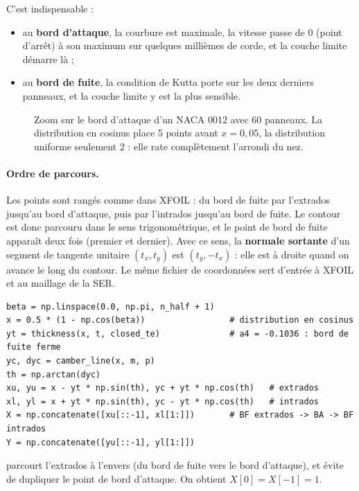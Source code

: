 C'est indispensable :
\begin{itemize}
\item au \textbf{bord d'attaque}, la courbure est maximale, la vitesse passe de 0 (point d'arrêt) à son maximum sur quelques millièmes de corde, et la couche limite démarre là ;
\item au \textbf{bord de fuite}, la condition de Kutta porte sur les deux derniers panneaux, et la couche limite y est la plus sensible.
\end{itemize}

\begin{figure}[htbp]
\centering

\caption{Zoom sur le bord d'attaque d'un NACA 0012 avec 60 panneaux. La distribution en cosinus place 5 points avant $x=0{,}05$, la distribution uniforme seulement 2 : elle rate complètement l'arrondi du nez.}\label{fig:cosinus}
\end{figure}

\paragraph{Ordre de parcours.} Les points sont rangés comme dans XFOIL : du bord de fuite par l'extrados jusqu'au bord d'attaque, puis par l'intrados jusqu'au bord de fuite. Le contour est donc parcouru dans le sens trigonométrique, et le point de bord de fuite apparaît deux fois (premier et dernier). Avec ce sens, la \textbf{normale sortante} d'un segment de tangente unitaire $(t_x,t_y)$ est $(t_y,-t_x)$ : elle est à droite quand on avance le long du contour. Le même fichier de coordonnées sert d'entrée à XFOIL et au maillage de la SER.

\begin{codebox}
\begin{lstlisting}
beta = np.linspace(0.0, np.pi, n_half + 1)
x = 0.5 * (1 - np.cos(beta))                 # distribution en cosinus
yt = thickness(x, t, closed_te)              # a4 = -0.1036 : bord de fuite ferme
yc, dyc = camber_line(x, m, p)
th = np.arctan(dyc)
xu, yu = x - yt * np.sin(th), yc + yt * np.cos(th)   # extrados
xl, yl = x + yt * np.sin(th), yc - yt * np.cos(th)   # intrados
X = np.concatenate([xu[::-1], xl[1:]])       # BF extrados -> BA -> BF intrados
Y = np.concatenate([yu[::-1], yl[1:]])
\end{lstlisting}
 parcourt l'extrados à l'envers (du bord de fuite vers le bord d'attaque), et  évite de dupliquer le point de bord d'attaque. On obtient $X[0]=X[-1]=1$.
\end{codebox}

